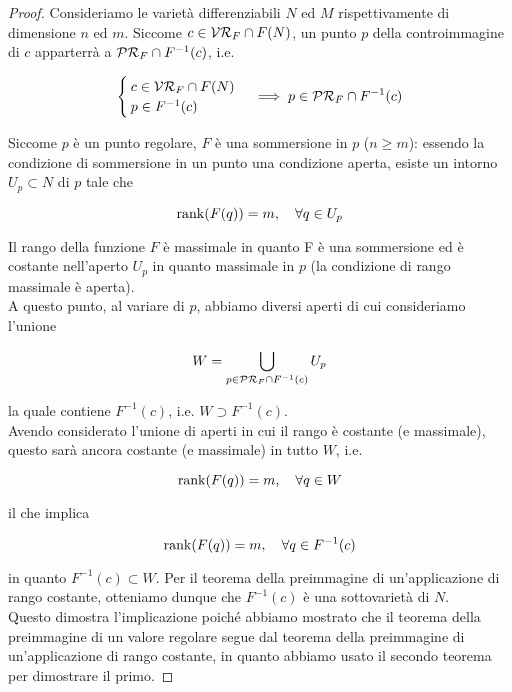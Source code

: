 \begin{proof}
	Consideriamo le varietà differenziabili $ N $ ed $ M $ rispettivamente di dimensione $ n $ ed $ m $. Siccome $ c \in \mathcal{VR}_{F} \cap F(N) $, un punto $ p $ della controimmagine di $ c $ apparterrà a $ \mathcal{PR}_{F} \cap F^{-1}(c) $, i.e.
	
	\begin{equation}
		\begin{cases}
			c \in \VR_{F} \cap F(N) \\
			p \in F^{-1}(c)
		\end{cases} %
		\implies %
		p \in \PR_{F} \cap F^{-1}(c)
	\end{equation}
	
	Siccome $ p $ è un punto regolare, $ F $ è una sommersione in $ p $ ($ n \geqslant m $): essendo la condizione di sommersione in un punto una condizione aperta, esiste un intorno $ U_{p} \subset N $ di $ p $ tale che
	
	\begin{equation}
		\rank(F(q)) = m \qcomma \forall q \in U_{p}
	\end{equation}
	
	Il rango della funzione $ F $ è massimale in quanto F è una sommersione ed è costante nell'aperto $ U_{p} $ in quanto massimale in $ p $ (la condizione di rango massimale è aperta).\\
	A questo punto, al variare di $ p $, abbiamo diversi aperti di cui consideriamo l'unione
	
	\begin{equation}
		W = \bigcup_{p \in \mathcal{PR}_{F} \cap F^{-1}(c)} U_{p}
	\end{equation}
	
	la quale contiene $ F^{-1}(c) $, i.e. $ W \supset F^{-1}(c) $.\\
	Avendo considerato l'unione di aperti in cui il rango è costante (e massimale), questo sarà ancora costante (e massimale) in tutto $ W $, i.e.
	
	\begin{equation}
		\rank(F(q)) = m \qcomma \forall q \in W
	\end{equation}

	il che implica
	
	\begin{equation}
		\rank(F(q)) = m \qcomma \forall q \in F^{-1}(c)
	\end{equation}
	
	in quanto $ F^{-1}(c) \subset W $. Per il teorema della preimmagine di un'applicazione di rango costante, otteniamo dunque che $ F^{-1}(c) $ è una sottovarietà di $ N $.\\	
	Questo dimostra l'implicazione poiché abbiamo mostrato che il teorema della preimmagine di un valore regolare segue dal teorema della preimmagine di un'applicazione di rango costante, in quanto abbiamo usato il secondo teorema per dimostrare il primo.
\end{proof}

